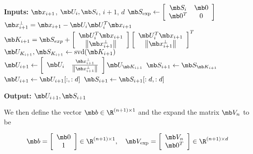 \begin{algorithm}[tb]
      \caption{$\mathtt{IncrPCA}(\mb x_{i+1}, \mb U_{i}, \mb S_{i}, i+1, d)$}\label{alg:TISVD_one_point)}
      \begin{algorithmic}[1]
      \STATE \textbf{Inputs:} $\mb x_{i+1}$, $\mb U_{i}, \mb S_{i}$, $i+1$, $d$
      \STATE $\mb S_{\text{exp}} \leftarrow \left[  \begin{array}{cc}
       \mb S_i & \mb 0  \\
        \mb 0^T   &  0
      \end{array}\right]$
      \STATE $\mb x_{i+1}^\perp = \mb x_{i+1} - \mb U_i \mb U_i^T \mb x_{i+1}$
      \STATE $\mb K_{i+1} = \mb S_{exp} + \left[ \begin{array}{c} \mb U^T_i \mb x_{i+1} \\ \left\| \mb x_{i+1}^\perp \right\| \end{array} \right] \left[ \begin{array}{c} \mb U^T_i \mb x_{i+1} \\ \left\| \mb x_{i+1}^\perp \right\| \end{array} \right] ^T$
    \STATE $\mb U_{K_{i+1}}, \mb S_{K_{i+1}} \leftarrow \mathrm{svd}(\mb K_{i+1})$
    \STATE $\mb U_{i+1} \leftarrow \left[\begin{array}{cc} \mb U_i  & \frac{\mb x_{i+1}^\perp}{\left \| \mb x_{i+1}^\perp \right\|} \end{array} \right] \mb U_{\mb K_{i+1}}$
    \STATE $\mb S_{i+1} \leftarrow \mb S_{\mb K_{i+1}}$
        \STATE $\mb U_{i+1} \leftarrow  \mb U_{i+1}[:, :d]$
        \STATE $\mb S_{i+1} \leftarrow  \mb S_{i+1}[:d, :d]$
    \ENDIF

    \STATE \textbf{Output:} $\mb U_{i+1}, \mb S_{i+1}$
    \end{algorithmic}
\end{algorithm}


We then define the vector  $\mb b \in \R^{(n+1) \times 1}$ and the expand the matrix $\mb V_n$ to be

\begin{eqnarray}
    \mb b = \left[ \begin{array}{c} \mb 0 \\ 1 \end{array} \right] \in \R^{(n+1) \times 1}, \quad \mb V_{\text{exp}} = \left[ \begin{array}{c} \mb V_n \\ \mb 0^T \end{array}
\right] \in \R^{(n + 1) \times d}
\end{eqnarray}


